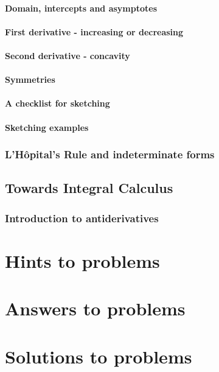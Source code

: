 \documentclass[12pt,letterpaper]{book}
\begin{document}
\subsection{Domain, intercepts and asymptotes}

\subsection{First derivative - increasing or decreasing}

\subsection{Second derivative - concavity}

\subsection{Symmetries}

%
\subsection{A checklist for sketching} 
%
\subsection{Sketching examples}

\section{L'H\^opital's Rule and indeterminate forms}


\chapter{Towards Integral Calculus}
\section{Introduction to antiderivatives}




\newpage
\part{Hints to problems}


\newpage
\part{Answers to problems}


\newpage
\part{Solutions to problems}

\end{document}
